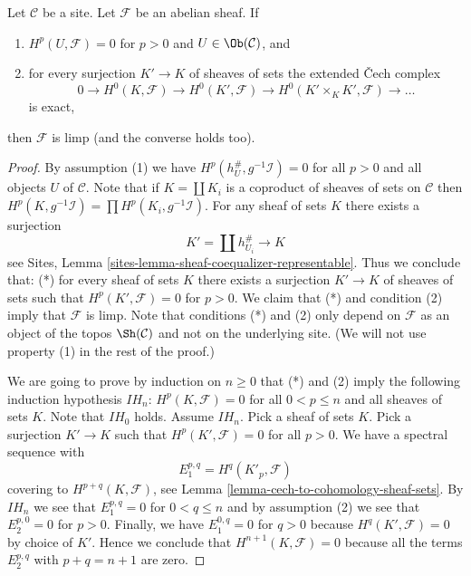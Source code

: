\begin{lemma}
\label{lemma-characterize-limp}
Let $\mathcal{C}$ be a site. Let $\mathcal{F}$ be an abelian sheaf. If
\begin{enumerate}
\item $H^p(U, \mathcal{F}) = 0$ for $p > 0$ and $U \in \Ob(\mathcal{C})$, and
\item for every surjection $K' \to K$ of sheaves of sets the
extended {\v C}ech complex
$$
0 \to H^0(K, \mathcal{F}) \to H^0(K', \mathcal{F}) \to
H^0(K' \times_K K', \mathcal{F}) \to \ldots
$$
is exact,
\end{enumerate}
then $\mathcal{F}$ is limp (and the converse holds too).
\end{lemma}

\begin{proof}
By assumption (1) we have $H^p(h_U^\#, g^{-1}\mathcal{I}) = 0$ for all
$p > 0$ and all objects $U$ of $\mathcal{C}$. Note that if
$K = \coprod K_i$ is a coproduct of sheaves of sets on $\mathcal{C}$
then $H^p(K, g^{-1}\mathcal{I}) = \prod H^p(K_i, g^{-1}\mathcal{I})$.
For any sheaf of sets $K$ there exists a surjection
$$
K' = \coprod h_{U_i}^\# \longrightarrow K
$$
see Sites, Lemma \ref{sites-lemma-sheaf-coequalizer-representable}.
Thus we conclude that: (*) for every sheaf of sets $K$ there exists a
surjection $K' \to K$ of sheaves of sets such that $H^p(K', \mathcal{F}) = 0$
for $p > 0$. We claim that (*) and condition (2) imply that $\mathcal{F}$
is limp. Note that conditions (*) and (2) only depend on $\mathcal{F}$ as an
object of the topos $\Sh(\mathcal{C})$ and not on the underlying site.
(We will not use property (1) in the rest of the proof.)

\medskip\noindent
We are going to prove by induction on $n \geq 0$ that (*) and (2)
imply the following induction hypothesis $IH_n$:
$H^p(K, \mathcal{F}) = 0$ for all $0 < p \leq n$ and
all sheaves of sets $K$. Note that $IH_0$ holds. Assume $IH_n$. Pick
a sheaf of sets $K$. Pick a surjection $K' \to K$ such that
$H^p(K', \mathcal{F}) = 0$ for all $p > 0$. We have a
spectral sequence with
$$
E_1^{p, q} = H^q(K'_p, \mathcal{F})
$$
covering to $H^{p + q}(K, \mathcal{F})$, see
Lemma \ref{lemma-cech-to-cohomology-sheaf-sets}.
By $IH_n$ we see that $E_1^{p, q} = 0$ for $0 < q \leq n$ and by
assumption (2) we see that $E_2^{p, 0} = 0$ for $p > 0$. Finally, we have
$E_1^{0, q} = 0$ for $q > 0$ because $H^q(K', \mathcal{F}) = 0$ by
choice of $K'$. Hence we conclude that $H^{n + 1}(K, \mathcal{F}) = 0$
because all the terms $E_2^{p, q}$ with $p + q = n + 1$ are zero.
\end{proof}







